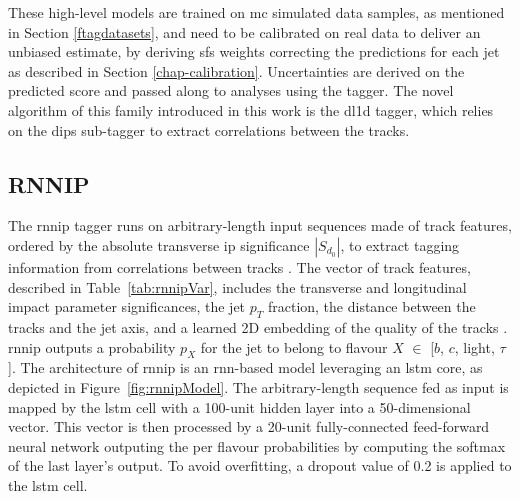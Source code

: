 These high-level models are trained on \gls{mc} simulated data samples, as mentioned in Section \ref{ftagdatasets}, and need to be calibrated on real data to deliver an unbiased estimate, by deriving \glspl{sf} weights correcting the predictions for each jet as described in Section \ref{chap-calibration}. Uncertainties are derived on the predicted score and passed along to analyses using the tagger. The novel algorithm of this family introduced in this work is the \gls{dl1d} tagger, which relies on the \gls{dips} sub-tagger to extract correlations between the tracks.  

\subsection{RNNIP}
The \gls{rnnip} tagger runs on arbitrary-length input sequences made of track features, ordered by the absolute transverse \gls{ip} significance $|S_{d_0}|$, to extract tagging information from correlations between tracks \cite{ATL-PHYS-PUB-2017-003}. The vector of track features, described in Table~\ref{tab:rnnipVar}, includes the transverse and longitudinal impact parameter significances, the jet $p_T$ fraction, the distance between the tracks and the jet axis, and a learned 2D embedding of the quality of the tracks \cite{Paganini:2289214}. \gls{rnnip} outputs a probability $p_X$ for the jet to belong to flavour $X$ $\in$ [$b$, $c$, light, $\tau$]. The architecture of \gls{rnnip} is an \gls{rnn}-based model leveraging an \gls{lstm} core, as depicted in Figure~\ref{fig:rnnipModel}. The arbitrary-length sequence fed as input is mapped by the \gls{lstm} cell with a 100-unit hidden layer into a 50-dimensional vector. This vector is then processed by a 20-unit fully-connected feed-forward neural network outputing the per flavour probabilities by computing the softmax of the last layer's output. To avoid overfitting, a dropout value of 0.2 is applied to the \gls{lstm} cell. \\

